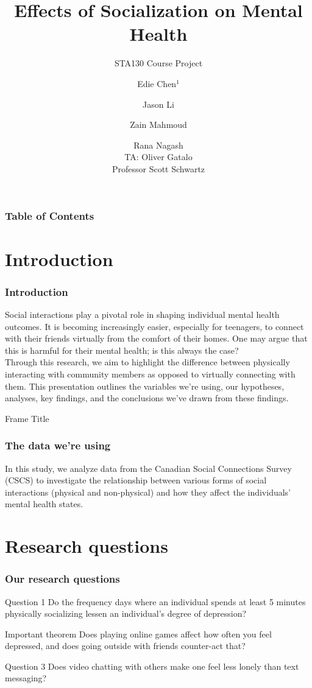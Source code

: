 \documentclass{beamer}
\title[Social Connections Analysis]
{Effects of Socialization on Mental Health}
\subtitle{STA130 Course Project}
\author[STA130] %
{Edie Chen$^1$ \and Jason Li \and Zain Mahmoud \and Rana Nagash\\
TA: Oliver Gatalo\\
Professor Scott Schwartz}
\institute[UofT] %
{
  STA130: An Introduction to Statistical Reasoning and Data Science\\
  Department of Statistical Sciences\\
  University of Toronto
}
\date[November 2024] %
\begin{document}
\frame{\titlepage}

\begin{frame}
\frametitle{Table of Contents}
\tableofcontents
\end{frame}

\section{Introduction}

\begin{frame}
\frametitle{Introduction}
Social interactions play a pivotal role in shaping individual mental health outcomes. It is becoming increasingly easier, especially for teenagers, to connect with their friends virtually from the comfort of their homes. One may argue that this is harmful for their mental health; is this always the case?\\
Through this research, we aim to highlight the difference between physically interacting with community members as opposed to virtually connecting with them. This presentation outlines the variables we're using, our hypotheses, analyses, key findings, and the conclusions we've drawn from these findings.

\end{frame}

\begin{frame}{Frame Title}
    \frametitle{The data we're using}
    In this study, we analyze data from the \alert{Canadian Social Connections Survey (CSCS)} to investigate the relationship between various forms of social interactions (physical and non-physical) and how they affect the individuals' mental health states. 
\end{frame}



\section{Research questions}

\begin{frame}
\frametitle{Our research questions}

\begin{block}{Question 1}
Do the frequency days where an individual spends at least 5 minutes physically socializing lessen an individual’s degree of depression?
\end{block}

\begin{alertblock}{Important theorem}
Does playing online games affect how often you feel depressed, and does going outside with friends counter-act that? 
\end{alertblock}

\begin{block}{Question 3}
    Does video chatting with others make one feel less lonely than text messaging? 
\end{block}
\end{frame}
\end{document}
